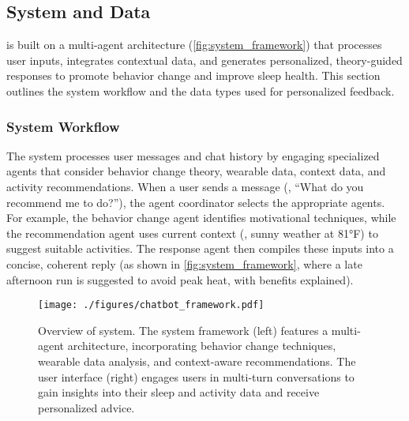 \subsection{System and Data}\label{sec.system_data}
\name{} is built on a multi-agent architecture (\autoref{fig:system_framework}) that processes user inputs, integrates contextual data, and generates personalized, theory-guided responses to promote behavior change and improve sleep health. 
This section outlines the system workflow and the data types used for personalized feedback.


\subsubsection{System Workflow}
The system processes user messages and chat history by engaging specialized agents that consider behavior change theory, wearable data, context data, and activity recommendations.
When a user sends a message (\eg, ``What do you recommend me to do?''), the agent coordinator selects the appropriate agents. For example, the behavior change agent identifies motivational techniques, while the recommendation agent uses current context (\eg, sunny weather at 81°F) to suggest suitable activities. 
The response agent then compiles these inputs into a concise, coherent reply (as shown in \autoref{fig:system_framework}, where a late afternoon run is suggested to avoid peak heat, with benefits explained).


\begin{figure*}
  \texttt{[image: ./figures/chatbot\_framework.pdf]}
  \caption{Overview of \name{} system. The system framework (left) features a multi-agent architecture, incorporating behavior change techniques, wearable data analysis, and context-aware recommendations. 
  The user interface (right) engages users in multi-turn conversations to gain insights into their sleep and activity data and receive personalized advice.}
  \label{fig:system_framework}
\end{figure*}

